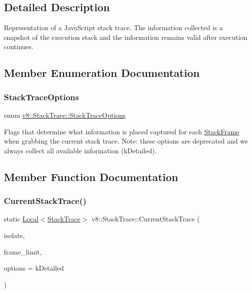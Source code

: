 \subsection{Detailed Description}
Representation of a Java\+Script stack trace. The information collected is a snapshot of the execution stack and the information remains valid after execution continues. 

\subsection{Member Enumeration Documentation}
\mbox{\label{classv8_1_1StackTrace_a9704e4a37949eb8eb8ccddbddf161492}} 
\subsubsection{\texorpdfstring{Stack\+Trace\+Options}{StackTraceOptions}}
{\footnotesize\ttfamily enum \mbox{\hyperlink{classv8_1_1StackTrace_a9704e4a37949eb8eb8ccddbddf161492}{v8\+::\+Stack\+Trace\+::\+Stack\+Trace\+Options}}}

Flags that determine what information is placed captured for each \mbox{\hyperlink{classv8_1_1StackFrame}{Stack\+Frame}} when grabbing the current stack trace. Note\+: these options are deprecated and we always collect all available information (k\+Detailed). 

\subsection{Member Function Documentation}
\mbox{\label{classv8_1_1StackTrace_a9ae3595dfa217d50a60cea7ea2e87366}} 
\subsubsection{\texorpdfstring{Current\+Stack\+Trace()}{CurrentStackTrace()}}
{\footnotesize\ttfamily static \mbox{\hyperlink{classv8_1_1Local}{Local}}$<$\mbox{\hyperlink{classv8_1_1StackTrace}{Stack\+Trace}}$>$ v8\+::\+Stack\+Trace\+::\+Current\+Stack\+Trace (\begin{DoxyParamCaption}\item[{Isolate $\ast$}]{isolate,  }\item[{int}]{frame\+\_\+limit,  }\item[{\mbox{\hyperlink{classv8_1_1StackTrace_a9704e4a37949eb8eb8ccddbddf161492}{Stack\+Trace\+Options}}}]{options = {\ttfamily kDetailed} }\end{DoxyParamCaption})\hspace{0.3cm}{\ttfamily [static]}}

